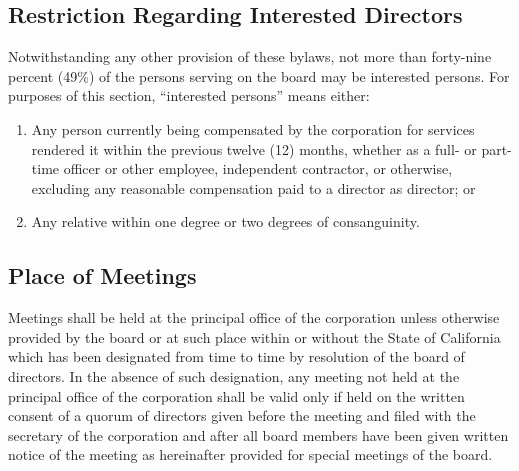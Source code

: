 \documentclass{article}
\begin{document}
	\subsection{Restriction Regarding Interested Directors}
	Notwithstanding any other provision of these bylaws, not more than forty-nine percent (49\%) of the persons serving on the board may be interested persons. For purposes of this section, ``interested persons'' means either: 
	\begin{enumerate}[\indent (a)]
		\item Any person currently being compensated by the corporation for services rendered it within the previous twelve (12) months, whether as a full- or part-time officer or other employee, independent contractor, or otherwise, excluding any reasonable compensation paid to a director as director; or
		\item Any relative within one degree or two degrees of consanguinity.
	\end{enumerate}
	\subsection{Place of Meetings}
	Meetings shall be held at the principal office of the corporation unless otherwise provided by the board or at such place within or without the State of California which has been designated from time to time by resolution of the board of directors. In the absence of such designation, any meeting not held at the principal office of the corporation shall be valid only if held on the written consent of a quorum of directors given before the meeting and filed with the secretary of the corporation and after all board members have been given written notice of the meeting as hereinafter provided for special meetings of the board.
	
\end{document}
